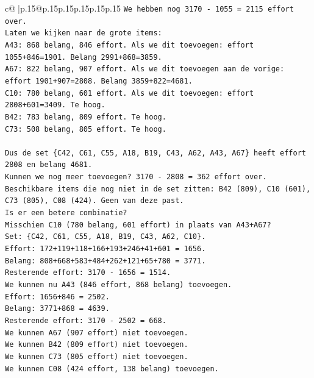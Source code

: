 \documentclass{article}
\begin{document}
{\begin{supertabular}{c@{$\;$}|p{.15\linewidth}@{}p{.15\linewidth}p{.15\linewidth}p{.15\linewidth}p{.15\linewidth}p{.15\linewidth}}
{{{\texttt{We hebben nog 3170 {-} 1055 = 2115 effort over.} \\
\texttt{Laten we kijken naar de grote items:} \\
\texttt{A43: 868 belang, 846 effort. Als we dit toevoegen: effort 1055+846=1901. Belang 2991+868=3859.} \\
\texttt{A67: 822 belang, 907 effort. Als we dit toevoegen aan de vorige: effort 1901+907=2808. Belang 3859+822=4681.} \\
\texttt{C10: 780 belang, 601 effort. Als we dit toevoegen: effort 2808+601=3409. Te hoog.} \\
\texttt{B42: 783 belang, 809 effort. Te hoog.} \\
\texttt{C73: 508 belang, 805 effort. Te hoog.} \\
\\ 
\texttt{Dus de set \{C42, C61, C55, A18, B19, C43, A62, A43, A67\} heeft effort 2808 en belang 4681.} \\
\texttt{Kunnen we nog meer toevoegen? 3170 {-} 2808 = 362 effort over.} \\
\texttt{Beschikbare items die nog niet in de set zitten: B42 (809), C10 (601), C73 (805), C08 (424). Geen van deze past.} \\
\texttt{Is er een betere combinatie?} \\
\texttt{Misschien C10 (780 belang, 601 effort) in plaats van A43+A67?} \\
\texttt{Set: \{C42, C61, C55, A18, B19, C43, A62, C10\}.} \\
\texttt{Effort: 172+119+118+166+193+246+41+601 = 1656.} \\
\texttt{Belang: 808+668+583+484+262+121+65+780 = 3771.} \\
\texttt{Resterende effort: 3170 {-} 1656 = 1514.} \\
\texttt{We kunnen nu A43 (846 effort, 868 belang) toevoegen.} \\
\texttt{Effort: 1656+846 = 2502.} \\
\texttt{Belang: 3771+868 = 4639.} \\
\texttt{Resterende effort: 3170 {-} 2502 = 668.} \\
\texttt{We kunnen A67 (907 effort) niet toevoegen.} \\
\texttt{We kunnen B42 (809 effort) niet toevoegen.} \\
\texttt{We kunnen C73 (805 effort) niet toevoegen.} \\
\texttt{We kunnen C08 (424 effort, 138 belang) toevoegen.} \\
}}}
\end{supertabular}}
\end{document}
